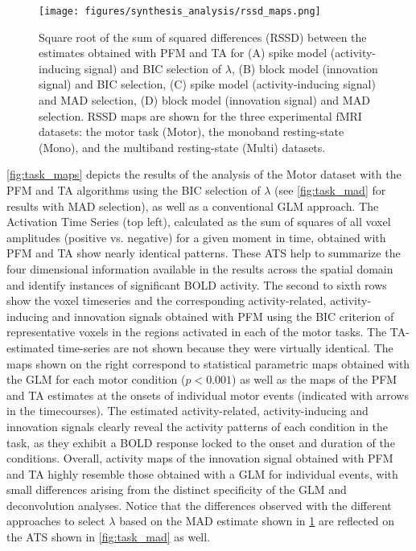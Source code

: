 \begin{figure}[t!]
    \begin{center}
        \texttt{[image: figures/synthesis\_analysis/rssd\_maps.png]}
    \end{center}
    \caption{Square root of the sum of squared differences (RSSD) between the estimates obtained with PFM and TA for (A) spike model (activity-inducing signal) and BIC selection of $\lambda$, (B) block model (innovation signal) and BIC selection, (C) spike model (activity-inducing signal) and MAD selection, (D) block model (innovation signal) and MAD selection. RSSD maps are shown for the three experimental fMRI datasets: the motor task (Motor), the monoband resting-state (Mono), and the multiband resting-state (Multi) datasets.}
\label{fig:rss}
\end{figure}

\cref{fig:task_maps} depicts the results of the analysis of the Motor dataset
with the PFM and TA algorithms using the BIC selection of $\lambda$ (see
\cref{fig:task_mad} for results with MAD selection), as well as a conventional
GLM approach. The Activation Time Series (top left), calculated as the sum of
squares of all voxel amplitudes (positive vs. negative) for a given moment in
time, obtained with PFM and TA show nearly identical patterns. These ATS help to
summarize the four dimensional information available in the results across the
spatial domain and identify instances of significant BOLD activity. The second
to sixth rows show the voxel timeseries and the corresponding activity-related,
activity-inducing and innovation signals obtained with PFM using the BIC
criterion of representative voxels in the regions activated in each of the motor
tasks. The TA-estimated time-series are not shown because they were virtually
identical. The maps shown on the right correspond to statistical parametric maps
obtained with the GLM for each motor condition ($p < 0.001$) as well as the maps
of the PFM and TA estimates at the onsets of individual motor events (indicated
with arrows in the timecourses). The estimated activity-related,
activity-inducing and innovation signals clearly reveal the activity patterns of
each condition in the task, as they exhibit a BOLD response locked to the onset
and duration of the conditions. Overall, activity maps of the innovation signal
obtained with PFM and TA highly resemble those obtained with a GLM for
individual events, with small differences arising from the distinct specificity
of the GLM and deconvolution analyses. Notice that the differences observed with
the different approaches to select $\lambda$ based on the MAD estimate shown in
\cref{fig:rss} are reflected on the ATS shown in \cref{fig:task_mad} as well.

